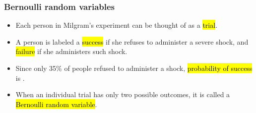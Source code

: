 \documentclass[slidestop,compress,mathserif]{beamer}
\begin{document}
\begin{frame}
\frametitle{Bernoulli random variables}

\begin{itemize}

\item Each person in Milgram's experiment can be thought of as a \hl{trial}.

\item A person is labeled a \hl{success} if she refuses to administer a severe shock, and \hl{failure} if she administers such shock.

\item Since only 35\% of people refused to administer a shock, \hl{probability of success} is .

\item When an individual trial has only two possible outcomes, it is called a \hl{Bernoulli random variable}.

\end{itemize}

\end{frame}

\end{document}
